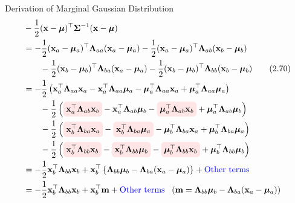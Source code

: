 \documentclass[10pt]{beamer}
\newcommand{\bluetext}[1]{\textcolor{blue}{#1}}
\newcommand{\highlight}[2][yellow]{\tikz[baseline=(x.base)]{\node[rectangle,rounded corners,fill=#1!10](x){$#2$};}}
\begin{document}
    \begin{frame}{Derivation of Marginal Gaussian Distribution}
        \begin{align*}
            &-\frac{1}{2}(\mathbf x - \bm\mu)^\top \bm\Sigma^{-1}(\mathbf x - \bm\mu) \\
            &=-\frac{1}{2}(\mathbf x_a - \bm\mu_a)^\top \bm\Lambda_{aa}(\mathbf x_a - \bm\mu_a)
            -\frac{1}{2}(\mathbf x_a - \bm\mu_a)^\top \bm\Lambda_{ab}(\mathbf x_b - \bm\mu_b) \\
            &\qquad -\frac{1}{2}(\mathbf x_b - \bm\mu_b)^\top \bm\Lambda_{ba}(\mathbf x_a - \bm\mu_a)
            -\frac{1}{2}(\mathbf x_b - \bm\mu_b)^\top \bm\Lambda_{bb}(\mathbf x_b - \bm\mu_b) \tag{2.70} \\
            &= -\frac{1}{2}\left( \mathbf x_a^\top\bm\Lambda_{aa}\mathbf x_a - \mathbf x_a^\top\bm\Lambda_{aa}\bm\mu_a - 
                               \bm\mu_a^\top\bm\Lambda_{aa}\mathbf x_a + \bm\mu_a^\top\bm\Lambda_{aa}\bm\mu_a \right) \\
            &\qquad -\frac{1}{2}\left( \highlight[red]{\mathbf x_a^\top\bm\Lambda_{ab}\mathbf x_b} - \mathbf x_a^\top\bm\Lambda_{ab}\bm\mu_b - 
                               \highlight[red]{\bm\mu_a^\top\bm\Lambda_{ab}\mathbf x_b} + \bm\mu_a^\top\bm\Lambda_{ab}\bm\mu_b \right) \\
            &\qquad -\frac{1}{2}\left( \highlight[red]{\mathbf x_b^\top\bm\Lambda_{ba}\mathbf x_a} - \highlight[red]{\mathbf x_b^\top\bm\Lambda_{ba}\bm\mu_a} - 
                               \bm\mu_b^\top\bm\Lambda_{ba}\mathbf x_a + \bm\mu_b^\top\bm\Lambda_{ba}\bm\mu_a \right) \\
            &\qquad -\frac{1}{2}\left( \highlight[red]{\mathbf x_b^\top\bm\Lambda_{bb}\mathbf x_b} - \highlight[red]{\mathbf x_b^\top\bm\Lambda_{bb}\bm\mu_b} - 
                               \highlight[red]{\bm\mu_b^\top\bm\Lambda_{bb}\mathbf x_b} + \bm\mu_b^\top\bm\Lambda_{bb}\bm\mu_b \right) \\
            &= -\frac{1}{2}\mathbf x_b^\top\bm\Lambda_{bb}\mathbf x_b + \mathbf x_b^\top \left\{ \bm\Lambda_{bb}\bm\mu_b - \bm\Lambda_{ba}(\mathbf x_a - \bm\mu_a) \right\} 
                + \mbox{\bluetext{Other terms}} \\
            &= -\frac{1}{2}\mathbf x_b^\top\bm\Lambda_{bb}\mathbf x_b + \mathbf x_b^\top \mathbf m + \mbox{\bluetext{Other terms}} \;\;\;
                (\mathbf m = \bm\Lambda_{bb}\bm\mu_b - \bm\Lambda_{ba}(\mathbf x_a - \bm\mu_a))
        \end{align*}
    \end{frame}
    
\end{document}
